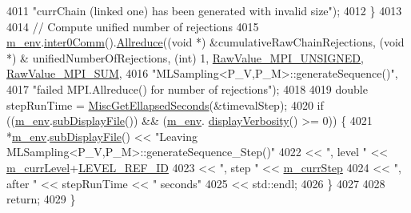 \begin{DoxyCode}
4011                         \textcolor{stringliteral}{"currChain (linked one) has been generated with invalid size"});
4012   \}
4013 
4014   \textcolor{comment}{// Compute unified number of rejections}
4015   \hyperlink{class_q_u_e_s_o_1_1_m_l_sampling_a13f1ca4fe9f94822fe572a743eaced1d}{m\_env}.\hyperlink{class_q_u_e_s_o_1_1_base_environment_a689e4d140c74d495d97eb498714a4b82}{inter0Comm}().\hyperlink{class_q_u_e_s_o_1_1_mpi_comm_a72e137e60ef8060efb1ee5fc874fa4b8}{Allreduce}((\textcolor{keywordtype}{void} *) &cumulativeRawChainRejections, (\textcolor{keywordtype}{void} *) &
      unifiedNumberOfRejections, (\textcolor{keywordtype}{int}) 1, \hyperlink{_mpi_comm_8h_a06cbfbc33436f6e0dc8a48ff3c49bdfc}{RawValue\_MPI\_UNSIGNED}, 
      \hyperlink{_mpi_comm_8h_afbf78d291c032aa7f512bc566cee2bd1}{RawValue\_MPI\_SUM},
4016                                \textcolor{stringliteral}{"MLSampling<P\_V,P\_M>::generateSequence()"},
4017                                \textcolor{stringliteral}{"failed MPI.Allreduce() for number of rejections"});
4018 
4019   \textcolor{keywordtype}{double} stepRunTime = \hyperlink{namespace_q_u_e_s_o_a424bc33f2e6e287fd468408d14b772ee}{MiscGetEllapsedSeconds}(&timevalStep);
4020   \textcolor{keywordflow}{if} ((\hyperlink{class_q_u_e_s_o_1_1_m_l_sampling_a13f1ca4fe9f94822fe572a743eaced1d}{m\_env}.\hyperlink{class_q_u_e_s_o_1_1_base_environment_a8a0064746ae8dddfece4229b9ad374d6}{subDisplayFile}()) && (\hyperlink{class_q_u_e_s_o_1_1_m_l_sampling_a13f1ca4fe9f94822fe572a743eaced1d}{m\_env}.
      \hyperlink{class_q_u_e_s_o_1_1_base_environment_a1fe5f244fc0316a0ab3e37463f108b96}{displayVerbosity}() >= 0)) \{
4021     *\hyperlink{class_q_u_e_s_o_1_1_m_l_sampling_a13f1ca4fe9f94822fe572a743eaced1d}{m\_env}.\hyperlink{class_q_u_e_s_o_1_1_base_environment_a8a0064746ae8dddfece4229b9ad374d6}{subDisplayFile}() << \textcolor{stringliteral}{"Leaving MLSampling<P\_V,P\_M>::generateSequence\_Step()"}
4022                             << \textcolor{stringliteral}{", level "} << \hyperlink{class_q_u_e_s_o_1_1_m_l_sampling_af9416874c856e50f3b35270e801f17e4}{m\_currLevel}+\hyperlink{_m_l_sampling_level_options_8h_a68d15eaf394d210effcf584b938206d3}{LEVEL\_REF\_ID}
4023                             << \textcolor{stringliteral}{", step "}  << \hyperlink{class_q_u_e_s_o_1_1_m_l_sampling_a1b1f8ccb4823bdfa26ec652f0807c63e}{m\_currStep}
4024                             << \textcolor{stringliteral}{", after "} << stepRunTime << \textcolor{stringliteral}{" seconds"}
4025                             << std::endl;
4026   \}
4027 
4028   \textcolor{keywordflow}{return};
4029 \}
\end{DoxyCode}
